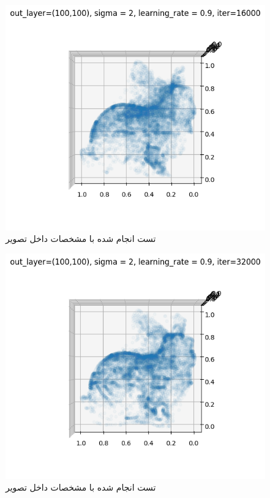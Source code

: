 \documentclass{article}
\begin{document}
\begin{figure}[!h]
    \centering\includegraphics[scale=.65]{./p1-6}
    \caption{تست انجام شده با مشخصات داخل تصویر}\label{fig.16}
\end{figure}

\begin{figure}[!h]
    \centering\includegraphics[scale=.65]{./p1-7}
    \caption{تست انجام شده با مشخصات داخل تصویر}\label{fig.17}
\end{figure}
\end{document}

